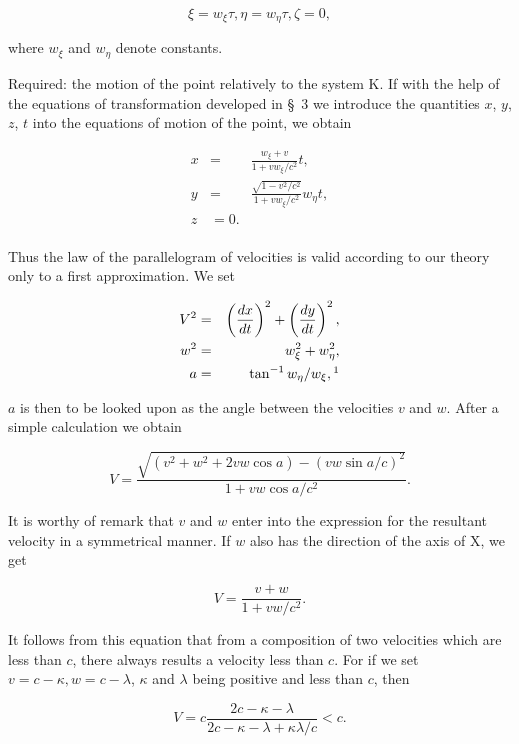 \documentclass{article}
\newcounter{fnsave}
\newcommand{\edNoteBegin}{
\renewcommand{\thefootnote}{\fnsymbol{footnote}}
\setcounter{fnsave}{\value{footnote}}
\setcounter{footnote}{1}
}
\newcommand{\edNoteEnd}{
\renewcommand{\thefootnote}{\arabic{footnote}}
\setcounter{footnote}{\value{fnsave}}
}
\begin{document}
\[
\xi=w_\xi \tau, \eta=w_\eta\tau, \zeta=0,
\]

\noindent
where $w_\xi$ and $w_\eta$ denote constants. 

Required: the motion of the point relatively to the system K\@.  If with
the help of the equations of transformation developed in \S\ 3 we
introduce the quantities $x$, $y$, $z$, $t$ into the equations of motion of
the point, we obtain

\begin{eqnarray*}
x & = & \frac{w_\xi+v}{1+vw_\xi/c^2}t, \\
y & = & \frac{\sqrt{1-v^2/c^2}}{1+vw_\xi/c^2}w_\eta t, \\
z & = 0. \\
\end{eqnarray*}

Thus the law of the parallelogram of velocities is valid according to
our theory only to a first approximation.  We set

\edNoteBegin
\setcounter{footnote}{2}
\setcounter{footnote}{1}
\begin{eqnarray*}
V^2 & = & \left(\frac{dx}{dt}\right)^2+\left(\frac{dy}{dt}\right)^2,\\
w^2 & = & w_\xi^2+w_\eta^2, \\
a & = & \tan^{-1} w_\eta/w_\xi,\footnotemark \\
\end{eqnarray*}
\edNoteEnd

\noindent
$a$ is then to be looked upon as the angle between the velocities $v$ and
$w$.  After a simple calculation we obtain

\[
V = \frac{\sqrt{(v^2+w^2+2vw\cos a)-(vw\sin a/c)^2}}{1+vw\cos a/c^2}.
\]

\noindent
It is worthy of remark that $v$ and $w$ enter into the expression for the
resultant velocity in a symmetrical manner.  If $w$ also has the
direction of the axis of X, we get

\[
V = \frac{v+w}{1+vw/c^2}.
\]

\noindent
It follows from this equation that from a composition of two
velocities which are less than $c$, there always results a velocity less
than $c$.  For if we set $v=c-\kappa, w=c-\lambda$,
$\kappa$ and $\lambda$ being positive
and less than $c$, then

\[
V = c\frac{2c-\kappa-\lambda}{2c-\kappa-\lambda+\kappa\lambda/c}<c.
\]
\end{document}
